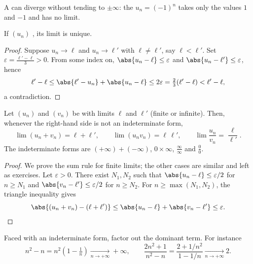\begin{remark}
A  can diverge without tending to $\pm\infty$: the 
$u_n = (-1)^n$ takes only the values $1$ and $-1$ and has no limit.
\end{remark}

\begin{proposition}\label{prop:g12:seq:uniqueness}
If $(u_n)$ , its limit is unique.
\end{proposition}

\begin{proof}
Suppose $u_n \to \ell$ and $u_n \to \ell'$ with $\ell \neq \ell'$, say
$\ell < \ell'$. Set $\varepsilon = \frac{\ell' - \ell}{3} > 0$. From some
index on, $\abs{u_n - \ell} \leq \varepsilon$ and
$\abs{u_n - \ell'} \leq \varepsilon$, hence
\[
\ell' - \ell \leq \abs{\ell' - u_n} + \abs{u_n - \ell}
\leq 2\varepsilon = \tfrac{2}{3}(\ell' - \ell) < \ell' - \ell,
\]
a contradiction.
\end{proof}

\begin{proposition}\label{prop:g12:seq:operations}
Let $(u_n)$ and $(v_n)$ be  with limits $\ell$ and $\ell'$ (finite or
infinite). Then, whenever the right-hand side is not an indeterminate form,
\[
\lim (u_n + v_n) = \ell + \ell', \qquad
\lim (u_n v_n) = \ell\,\ell', \qquad
\lim \frac{u_n}{v_n} = \frac{\ell}{\ell'}.
\]
The indeterminate forms are
$(+\infty) + (-\infty)$, $0 \times \infty$, $\frac{\infty}{\infty}$ and
$\frac{0}{0}$.
\end{proposition}

\begin{proof}
We prove the sum rule for finite limits; the other cases are similar and left
as exercises. Let $\varepsilon > 0$. There exist $N_1, N_2$ such that
$\abs{u_n - \ell} \leq \varepsilon/2$ for $n \geq N_1$ and
$\abs{v_n - \ell'} \leq \varepsilon/2$ for $n \geq N_2$. For
$n \geq \max(N_1, N_2)$, the triangle inequality gives
\[
\abs{(u_n + v_n) - (\ell + \ell')}
\leq \abs{u_n - \ell} + \abs{v_n - \ell'} \leq \varepsilon. \qedhere
\]
\end{proof}

\begin{method}\label{met:g12:seq:indeterminate}
Faced with an indeterminate form, factor out the dominant term. For instance
\[
n^2 - n = n^2\left(1 - \tfrac{1}{n}\right) \xrightarrow[n\to+\infty]{} +\infty,
\qquad
\frac{2n^2+1}{n^2 - n} = \frac{2 + 1/n^2}{1 - 1/n}
\xrightarrow[n\to+\infty]{} 2 .
\]
\end{method}

